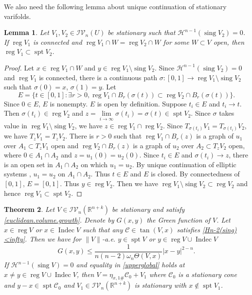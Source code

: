 \documentclass[11pt]{amsart}
\newtheorem{theorem}{Theorem}[section]
\newtheorem{lemma}[theorem]{Lemma}
\theoremstyle{definition}
\newcommand{\HH}{\mathcal{H}}
\newcommand{\R}{\mathbb{R}}
\newcommand{\C}{\mathcal{C}}
\newcommand{\IV}{\mathcal{IV}}
\DeclareMathOperator{\spt}{spt}
\DeclareMathOperator{\sing}{sing}
\DeclareMathOperator{\reg}{reg}
\DeclareMathOperator{\indec}{Indec}
\begin{document}
We also need the following lemma about unique continuation of stationary varifolds.
\begin{lemma}\label{unique.continuation}
    Let $V_1,V_2\in\IV_n(U)$ be stationary such that $\HH^{n-1}(\sing V_2)=0$. If $\reg V_1$ is connected and $\reg V_1\cap W=\reg V_2\cap W$ for some $W\subset V$ open, then $\reg V_1\subset \spt V_2$.
\end{lemma}
\begin{proof}
    Let $x\in \reg V_1\cap W$ and $y\in \reg V_1\setminus \sing V_2$. Since $\HH^{n-1}(\sing V_2)=0$ and $\reg V_1$ is connected, there is a continuous path $\sigma :[0,1]\to \reg V_1\setminus \sing V_2$ such that $\sigma(0)=x$, $\sigma(1)=y$. Let 
    \[E=\{t\in[0,1]:\exists r>0, \reg V_1\cap B_r(\sigma(t))\subset \reg V_2\cap B_r(\sigma(t))\}.\] Since $0\in E$, $E$ is nonempty. $E$ is open by definition. Suppose $t_i\in E$ and $t_i\to t$. Then $\sigma(t_i)\in \reg V_2$ and $z=\lim\limits_{i\to\infty} \sigma(t_i)=\sigma(t)\in \spt V_2$. Since $\sigma$ takes value in $\reg V_1\setminus\sing V_2$, we have $z\in \reg V_1\cap \reg V_2$. Since $T_{\sigma(t_i)}V_1=T_{\sigma(t_i)}V_2$, we have $T_{z}V_1=T_zV_2$. There is $r>0$ such that $\reg V_1\cap B_r(z)$ is a graph of $u_1$ over $A_1\subset T_z V_1$ open and $\reg V_2\cap B_r(z)$ is a graph of $u_2$ over $A_2\subset T_z V_2$ open, where $0\in A_1\cap A_2$ and $z=u_1(0)=u_2(0)$.  Since $t_i\in E$ and $\sigma(t_i)\to z$, there is an open set in $A_1\cap A_2$ on which $u_1=u_2$. By unique continuation of elliptic systems \cite{Protter60}, $u_1=u_2$ on $A_1\cap A_2$. Thus $t\in E$ and $E$ is closed. By connectedness of $[0,1]$, $E=[0,1]$. Thus $y\in \reg V_2$. Then we have $\reg V_1\setminus \sing V_2\subset \reg V_2$ and hence $\reg V_1\subset \spt V_2$.
\end{proof}
    \begin{theorem}
        \label{sharp.upper.bound.singular.points}Let $V\in \IV_n(\R^{n+k})$ be stationary and satisfy \eqref{euclidean.volume.growth}. Denote by $G(x,y)$ the Green function of $V$. Let $x\in \reg V$ or $x\in \indec  V$ such that any $\C\in \tan(V,x)$ satisfies \eqref{Hn-2(sing)<infty}. Then we have for $\|V\|$-a.e. $y\in \spt V$ or $y\in \reg V\cup \indec V$
	\begin{equation}\label{upperglobal}
	    G(x,y)\le\frac{1}{n(n-2)\omega_n\Theta(V,x)}|x-y|^{2-n}.
	\end{equation}
	If $\HH^{n-1}(\sing V)=0$ and equality in \eqref{upperglobal} holds at $x\neq y\in \reg V\cup \indec V$, then $V=\eta_{x,1\#}\C_0+V_1$ where $\C_0$ is a stationary cone and $y-x\in \spt \C_0$ and $V_1\in \IV_n(\R^{n+k})$ is stationary with $x\notin \spt V_1$.
    \end{theorem}
\end{document}
